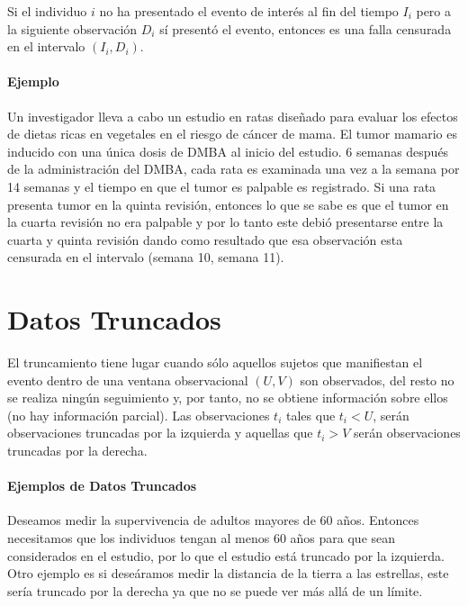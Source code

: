 \documentclass[
  a4paper,
  oneside,
  openany]{book}
\begin{document}
Si el individuo \(i\) no ha presentado el evento de interés al fin del tiempo \(I_i\) pero a la siguiente observación \(D_i\) sí presentó el evento, entonces es una falla censurada en el intervalo \((I_i,D_i)\).

\hypertarget{ejemplo-4}{%
\subsubsection*{Ejemplo}\label{ejemplo-4}}


Un investigador lleva a cabo un estudio en ratas diseñado para evaluar los efectos de dietas ricas en vegetales en el riesgo de cáncer de mama. El tumor mamario es inducido con una única dosis de DMBA al inicio del estudio. 6 semanas después de la administración del DMBA, cada rata es examinada una vez a la semana por 14 semanas y el tiempo en que el tumor es palpable es registrado. Si una rata presenta tumor en la quinta revisión, entonces lo que se sabe es que el tumor en la cuarta revisión no era palpable y por lo tanto este debió presentarse entre la cuarta y quinta revisión dando como resultado que esa observación esta censurada en el intervalo (semana 10, semana 11).

\hypertarget{datos-truncados}{%
\chapter{Datos Truncados}\label{datos-truncados}}

El truncamiento tiene lugar cuando sólo aquellos sujetos que manifiestan el evento dentro de una ventana observacional \((U,V)\) son observados, del resto no se realiza ningún seguimiento y, por tanto, no se obtiene información sobre ellos (no hay información parcial). Las observaciones \(t_i\) tales que \(t_i<U\), serán observaciones truncadas por la izquierda y aquellas que \(t_i>V\) serán observaciones truncadas por la derecha.

\hypertarget{ejemplos-de-datos-truncados}{%
\subsubsection*{Ejemplos de Datos Truncados}\label{ejemplos-de-datos-truncados}}


Deseamos medir la supervivencia de adultos mayores de 60 años. Entonces necesitamos que los individuos tengan al menos 60 años para que sean considerados en el estudio, por lo que el estudio está truncado por la izquierda. Otro ejemplo es si deseáramos medir la distancia de la tierra a las estrellas, este sería truncado por la derecha ya que no se puede ver más allá de un límite.
\end{document}
